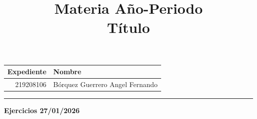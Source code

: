 \documentclass[a4paper, 11pt]{article}
\title
{
    Materia Año-Periodo \\
    Título
}
\begin{document}
    \maketitle

    \begin{center}
        \begin{tabular}{r|l}
            \textbf{Expediente} & \textbf{Nombre} \\ \hline
            219208106 & Bórquez Guerrero Angel Fernando \\
        \end{tabular}
    \end{center}

    \rule{\linewidth}{0.3mm}

    \vspace{0.3cm}
    {\Large \textbf{Ejercicios 27/01/2026}}
\end{document}
